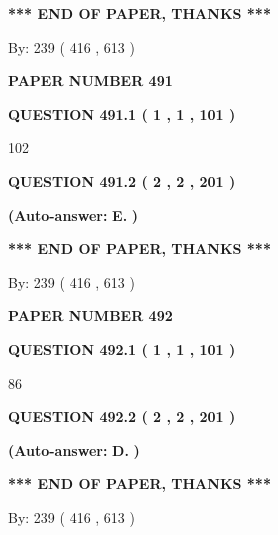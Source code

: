 \documentclass{ctexart}
\begin{document}
 
   
   
   
   
\vspace{1.0in} 
{\textbf{\large{ *** END OF PAPER, THANKS *** }}} 
   
   
\hspace{1.0in} By: 
 239 ( 416 ,  613 )
   
   
   
   
\newpage 
\setcounter{page}{ 
   491001 } 
   
   
 {\textbf{ \Large{ PAPER NUMBER  491  }}}
   
   
   
   
  
  
{\textbf{\large{QUESTION
491.1 
 ( 1 , 1 , 101 )
}}}

102
  
  
{\textbf{\large{QUESTION
491.2 
 ( 2 , 2 , 201 )
}}}
 
 
{\textbf{(Auto-answer:}}
{\textbf{\large{
E.}}}
{\textbf{)}}
 
 
   
   
   
   
\vspace{1.0in} 
{\textbf{\large{ *** END OF PAPER, THANKS *** }}} 
   
   
\hspace{1.0in} By: 
 239 ( 416 ,  613 )
   
   
   
   
\newpage 
\setcounter{page}{ 
   492001 } 
   
   
 {\textbf{ \Large{ PAPER NUMBER  492  }}}
   
   
   
   
  
  
{\textbf{\large{QUESTION
492.1 
 ( 1 , 1 , 101 )
}}}

86
  
  
{\textbf{\large{QUESTION
492.2 
 ( 2 , 2 , 201 )
}}}
 
 
{\textbf{(Auto-answer:}}
{\textbf{\large{
D.}}}
{\textbf{)}}
 
 
   
   
   
   
\vspace{1.0in} 
{\textbf{\large{ *** END OF PAPER, THANKS *** }}} 
   
   
\hspace{1.0in} By: 
 239 ( 416 ,  613 )
   
   
   
   
\newpage 
\setcounter{page}{ 
   493001 } 
   
\end{document}
